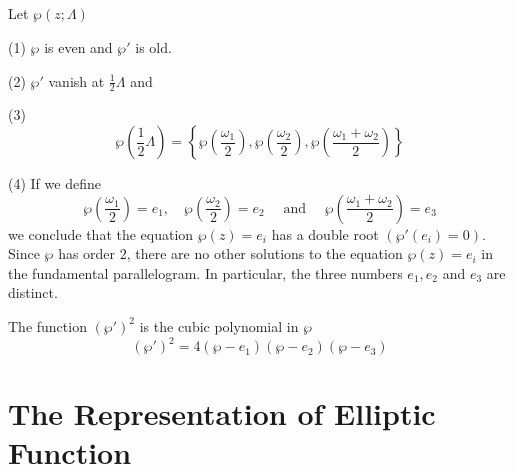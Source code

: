 \documentclass[12pt, oneside]{book}
\begin{document}
\subsection{}

\begin{proposition}
    Let $\wp(z;\Lambda)$

    (1) $\wp$ is even and $\wp'$ is old.


    (2) $\wp'$ vanish at  $\frac{1}{2}\Lambda$ and

    (3)
    \begin{equation*}
        \wp\left(\frac{1}{2}\Lambda\right)
        =
        \left\{
        \wp\left(\frac{\omega_1}{2}\right),
        \wp\left(\frac{\omega_2}{2}\right),
        \wp\left(\frac{\omega_1+\omega_2}{2}\right)\right\}
    \end{equation*}

    (4) If we define
    \begin{equation*}
        \wp\left(\frac{\omega_1}{2}\right)=e_1,
        \quad
        \wp\left(\frac{\omega_2}{2}\right)=e_2
        \quad\text{ and }\quad
        \wp\left(\frac{\omega_1+\omega_2}{2}\right)=e_3
    \end{equation*}
    we conclude that the equation $\wp(z) = e_i$ has a double root $(\wp'(e_i)=0)$. Since $\wp$ has order $2$, there are no other solutions to the equation $\wp(z) = e_i$ in the fundamental parallelogram. In particular, the three numbers $e_1, e_2$ and $e_3$ are distinct.
\end{proposition}

\begin{theorem}
    The function $\left(\wp'\right)^2$ is the cubic polynomial in $\wp$
    $$(\wp')^2=4(\wp-e_1)(\wp-e_2)(\wp-e_3)$$
\end{theorem}

\section{The Representation of Elliptic Function} %
\end{document}
